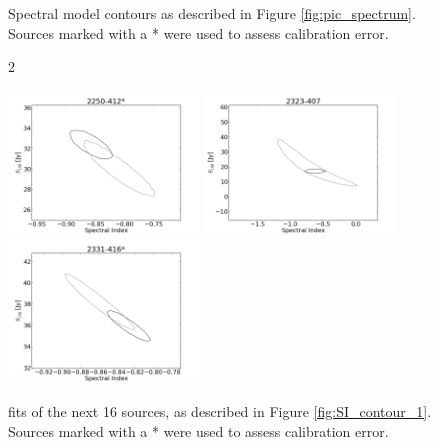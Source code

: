 \documentclass[preprint]{aastex}
\begin{document}
\begin{figure}[htbp]
\begin{center}
\end{center}
\caption{Spectral model contours as described in Figure \ref{fig:pic_spectrum}. Sources marked with a
* were used to assess calibration error.
}\label{fig:SI_contour_2}
\end{figure}
\clearpage
\begin{figure}[htbp]2\begin{center}
\includegraphics[width=2in]{plots/2250-412_SI_MCMC.png} %
\includegraphics[width=2in]{plots/2323-407_SI_MCMC.png} %
\includegraphics[width=2in]{plots/2331-416_SI_MCMC.png} %
\end{center}
\caption{fits of the next 16 sources, as described in Figure \ref{fig:SI_contour_1}. Sources marked with a
* were used to assess calibration error.
}\label{fig:SI_contour_3}
\end{figure}


\end{document}
